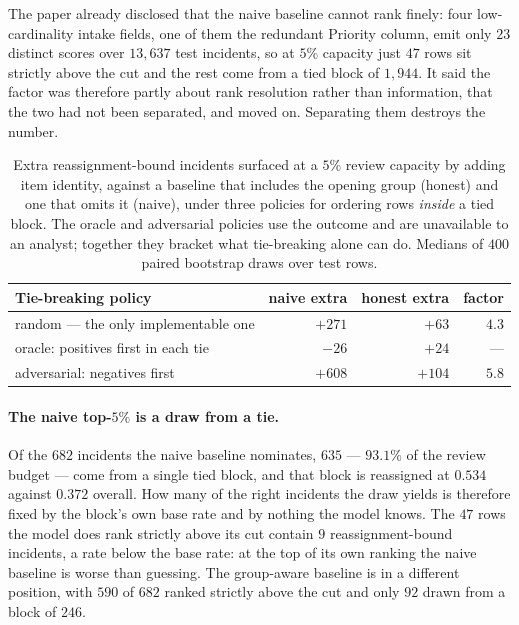 \documentclass[preprint,12pt]{elsarticle}
\begin{document}
The paper already disclosed that the naive baseline cannot rank finely: four
low-cardinality intake fields, one of them the redundant Priority column,
emit only $23$ distinct scores over $13{,}637$ test incidents, so
at $5\%$ capacity just $47$ rows sit strictly above the cut and
the rest come from a tied block of $1{,}944$. It said the factor
was therefore partly about rank resolution rather than information, that the
two had not been separated, and moved on. Separating them destroys the
number.

\begin{table}[t]
\centering\small\setlength{\tabcolsep}{6pt}
\begin{tabular}{@{}lrrr@{}}
\toprule
Tie-breaking policy & naive extra & honest extra & factor \\
\midrule
random --- the only implementable one & $+271$ & $+63$ & $4.3$ \\
oracle: positives first in each tie & $-26$ & $+24$ & --- \\
adversarial: negatives first & $+608$ & $+104$ & $5.8$ \\
\bottomrule
\end{tabular}
\caption{Extra reassignment-bound incidents surfaced at a $5\%$ review
capacity by adding item identity, against a baseline that includes the
opening group (honest) and one that omits it (naive), under three policies
for ordering rows \emph{inside} a tied block. The oracle and adversarial
policies use the outcome and are unavailable to an analyst; together they
bracket what tie-breaking alone can do. Medians of $400$ paired bootstrap
draws over test rows.}
\label{tab:tie}
\end{table}

\paragraph{The naive top-$5\%$ is a draw from a tie.}
Of the $682$ incidents the naive baseline nominates, $635$ --- $93.1\%$ of
the review budget --- come from a single tied block, and that block is
reassigned at $0.534$ against $0.372$ overall. How many of the right
incidents the draw yields is therefore fixed by the block's own base rate and
by nothing the model knows. The $47$ rows the model does rank strictly above
its cut contain $9$ reassignment-bound incidents, a rate below the base rate:
at the top of its own ranking the naive baseline is worse than guessing. The
group-aware baseline is in a different position, with $590$ of $682$ ranked
strictly above the cut and only $92$ drawn from a block of $246$.
\end{document}
